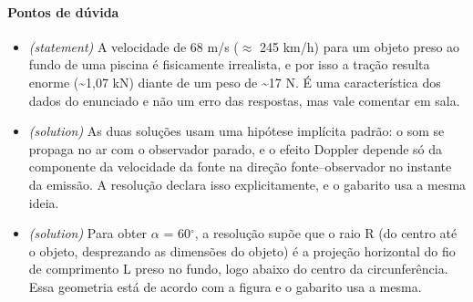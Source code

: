 \documentclass{article}%
\begin{document}
\paragraph{Pontos de dúvida}%
\begin{itemize}%
\item%
\textit{(statement)} A velocidade de 68 m/s ($\approx$ 245 km/h) para um objeto preso ao fundo de uma piscina é fisicamente irrealista, e por isso a tração resulta enorme (\textasciitilde{}1,07 kN) diante de um peso de \textasciitilde{}17 N. É uma característica dos dados do enunciado e não um erro das respostas, mas vale comentar em sala.%
\item%
\textit{(solution)} As duas soluções usam uma hipótese implícita padrão: o som se propaga no ar com o observador parado, e o efeito Doppler depende só da componente da velocidade da fonte na direção fonte--observador no instante da emissão. A resolução declara isso explicitamente, e o gabarito usa a mesma ideia.%
\item%
\textit{(solution)} Para obter $\alpha$ = 60$^\circ$, a resolução supõe que o raio R (do centro até o objeto, desprezando as dimensões do objeto) é a projeção horizontal do fio de comprimento L preso no fundo, logo abaixo do centro da circunferência. Essa geometria está de acordo com a figura e o gabarito usa a mesma.%
\end{itemize}%
\end{document}
